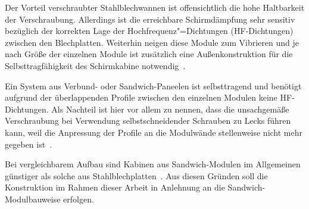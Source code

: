 Der Vorteil verschraubter Stahlblechwannen ist offensichtlich die hohe Haltbarkeit der Verschraubung. Allerdings ist die erreichbare Schirmdämpfung sehr sensitiv bezüglich der korrekten Lage der Hochfrequenz"=Dichtungen (HF-Dichtungen) zwischen den Blechplatten. Weiterhin neigen diese Module zum Vibrieren und je nach Größe der einzelnen Module ist zusätzlich eine Außenkonstruktion für die Selbsttragfähigkeit des Schirmkabine notwendig~\cite{EM_Schirmung}.
\par
\vspace{\linespace}
Ein System aus Verbund- oder Sandwich-Paneelen ist selbsttragend und benötigt aufgrund der überlappenden Profile zwischen den einzelnen Modulen keine HF-Dichtungen. Als Nachteil ist hier vor allem zu nennen, dass die unsachgemäße Verschraubung bei Verwendung selbstschneidender Schrauben zu Lecks führen kann, weil die Anpressung der Profile an die Modulwände stellenweise nicht mehr gegeben ist~\cite{EM_Schirmung}. 
\par
\vspace{\linespace}
Bei vergleichbarem Aufbau sind Kabinen aus Sandwich-Modulen im Allgemeinen günstiger als solche aus Stahlblechplatten~\cite{EMC-Technik_Sandwichmodul, EMC-Technik_Stahlblechplatten}. Aus diesen Gründen soll die Konstruktion im Rahmen dieser Arbeit in Anlehnung an die Sandwich-Modulbauweise erfolgen. 






